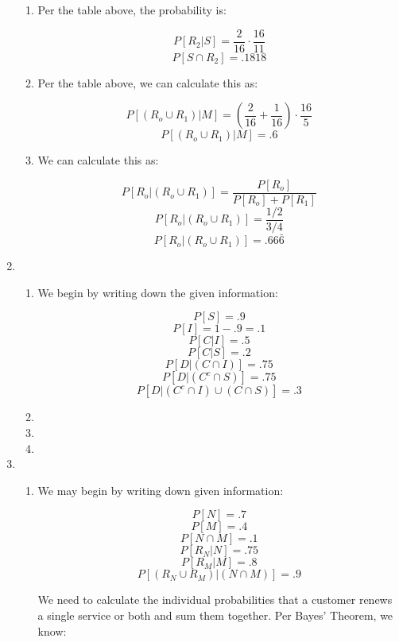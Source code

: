 \begin{enumerate}
\begin{enumerate}
      \item Per the table above, the probability is:

        $$P[R_2|S]=\frac{2}{16}\cdot\frac{16}{11}$$
        $$\boxed{P[S\cap R_2]=.1818}$$

      \item Per the table above, we can calculate this as:

        $$P[(R_o\cup R_1)|M]=\left(\frac{2}{16}+\frac{1}{16}\right)\cdot\frac{16}{5}$$
        $$\boxed{P[(R_o\cup R_1)|M]=.6}$$

      \item We can calculate this as:

        $$P[R_o|(R_o\cup R_1)]=\frac{P[R_o]}{P[R_o]+P[R_1]}$$
        $$P[R_o|(R_o\cup R_1)]=\frac{1/2}{3/4}$$
        $$\boxed{P[R_o|(R_o\cup R_1)]=.66\bar{6}}$$

    \end{enumerate}

  \item

    \begin{enumerate}

      \item We begin by writing down the given information:

        $$P[S]=.9$$
        $$P[I]=1-.9=.1$$
        $$P[C|I]=.5$$
        $$P[C|S]=.2$$
        $$P[D|(C\cap I)]=.75$$
        $$P[D|(C^c\cap S)]=.75$$
        $$P[D|(C^c\cap I)\cup (C\cap S)]=.3$$

      \item 

      \item 

      \item 

    \end{enumerate}

  \item

    \begin{enumerate}

      \item We may begin by writing down given information:

        $$P[N]=.7$$
        $$P[M]=.4$$
        $$P[N\cap M]=.1$$
        $$P[R_N|N]=.75$$
        $$P[R_M|M]=.8$$
        $$P[(R_N\cup R_M) |(N\cap M)]=.9$$

        We need to calculate the individual probabilities that a customer renews a single service or both and sum them together. Per Bayes' Theorem, we know:


\end{enumerate}
\end{enumerate}
